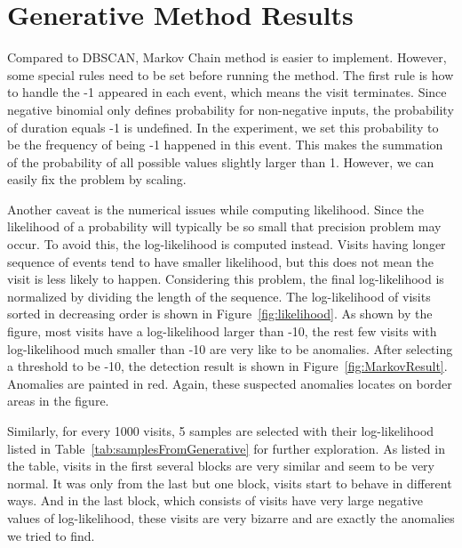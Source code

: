 \section{Generative Method Results}
\label{sec:generative}
Compared to DBSCAN, Markov Chain method is easier to implement. However, some special rules need to be set before running the method. The first rule is how to handle the -1 appeared in each event, which means the visit terminates. Since negative binomial only defines probability for non-negative inputs, the probability of duration equals -1 is undefined. In the experiment, we set this probability to be the frequency of being -1 happened in this event. This makes the summation of the probability of all possible values slightly larger than 1. However, we can easily fix the problem by scaling.

Another caveat is the numerical issues while computing likelihood. Since the likelihood of a probability will typically be so small that precision problem may occur. To avoid this, the log-likelihood is computed instead. Visits having longer sequence of events tend to have smaller likelihood, but this does not mean the visit is less likely to happen. Considering this problem, the final log-likelihood is normalized by dividing the length of the sequence. The log-likelihood of visits sorted in decreasing order is shown in Figure~\ref{fig:likelihood}. As shown by the figure, most visits have a log-likelihood larger than -10, the rest few visits with log-likelihood much smaller than -10 are very like to be anomalies. After selecting a threshold to be -10, the detection result is shown in Figure~\ref{fig:MarkovResult}. Anomalies are painted in red. Again, these suspected anomalies locates on border areas in the figure.

Similarly, for every 1000 visits, 5 samples are selected with their log-likelihood listed in Table~\ref{tab:samplesFromGenerative} for further exploration. As listed in the table, visits in the first several blocks are very similar and seem to be very normal. It was only from the last but one block, visits start to behave in different ways. And in the last block, which consists of visits have very large negative values of log-likelihood, these visits are very bizarre and are exactly the anomalies we tried to find.


